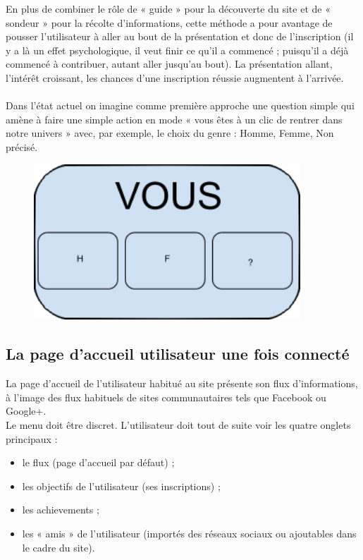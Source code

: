 \documentclass{life-fr}
\begin{document}
En plus de combiner le rôle de « guide » pour la découverte du site et de « sondeur » pour la récolte d'informations, cette méthode a pour avantage de pousser l'utilisateur à aller au bout de la présentation et donc de l'inscription (il y a là un effet psychologique, il veut finir ce qu'il a commencé ; puisqu'il a déjà commencé à contribuer, autant aller jusqu'au bout). La présentation allant, l'intérêt croissant, les chances d'une inscription réussie augmentent à l'arrivée.\\
\\

Dans l'état actuel on imagine comme première approche une question simple qui amène à faire une simple action en mode « vous êtes à un clic de rentrer dans notre univers » avec, par exemple, le choix du genre : Homme, Femme, Non précisé.

\begin{figure}[H]
  \begin{center}
    \includegraphics[width=10cm]{img/vous.png}
  \end{center}
\end{figure}

\newpage

\subsection{La page d'accueil utilisateur une fois connecté}

La page d'accueil de l'utilisateur habitué au site présente son flux d'informations, à l'image des flux habituels de sites communautaires tels que Facebook ou Google+. \\

Le menu doit être discret. L'utilisateur doit tout de suite voir les quatre onglets principaux :

\begin{itemize}
  \item le flux (page d'accueil par défaut) ;
  \item les objectifs de l'utilisateur (ses inscriptions) ;
  \item les achievements ;
  \item les « amis » de l'utilisateur (importés des réseaux sociaux ou ajoutables dans le cadre du site).
\end{itemize}
\end{document}
